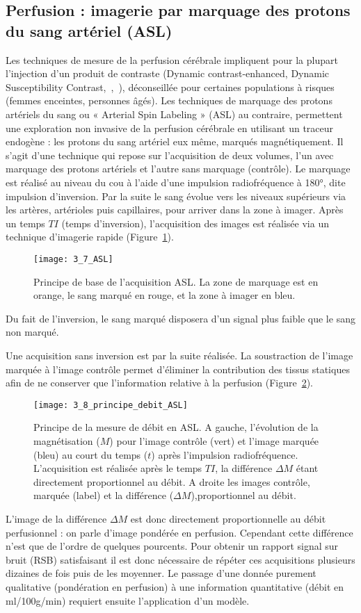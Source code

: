 \subsection{Perfusion : imagerie par marquage des protons du sang artériel (ASL)}
Les techniques de mesure de la perfusion cérébrale impliquent pour la plupart l’injection d’un
produit de contraste (Dynamic contrast-enhanced, Dynamic Susceptibility Contrast,~\cite{Calamante2010},~\cite{OConnor2011}),
déconseillée pour certaines populations à risques (femmes enceintes, personnes âgés). Les techniques
de marquage des protons artériels du sang ou « Arterial Spin Labeling » (ASL) au contraire, permettent
une exploration non invasive de la perfusion cérébrale en utilisant un traceur endogène : les protons
du sang artériel eux même, marqués magnétiquement. Il s’agit d’une technique qui repose sur
l’acquisition de deux volumes, l’un avec marquage des protons artériels et l’autre sans marquage
(contrôle). Le marquage est réalisé au niveau du cou à l’aide d’une impulsion radiofréquence à 180°,
dite impulsion d’inversion. Par la suite le sang évolue vers les niveaux supérieurs via les artères,
artérioles puis capillaires, pour arriver dans la zone à imager. Après un temps $TI$ (temps d’inversion),
l’acquisition des images est réalisée via un technique d’imagerie rapide (Figure~\ref{fig:3_7_ASL}). 
\begin{figure}[!t]
\centering
\texttt{[image: 3\_7\_ASL]}
\caption{Principe de base de l'acquisition ASL. La zone de marquage est en orange, le sang marqué en rouge, et la zone à
imager en bleu.}
\label{fig:3_7_ASL}	
\end{figure}
Du fait de
l’inversion, le sang marqué disposera d’un signal plus faible que le sang non marqué.

Une acquisition sans inversion est par la suite réalisée. La soustraction de l’image marquée à
l’image contrôle permet d’éliminer la contribution des tissus statiques afin de ne conserver que
l’information relative à la perfusion (Figure~\ref{fig:3_8_principe_debit_ASL}).
\begin{figure}[!t]
\centering
\texttt{[image: 3\_8\_principe\_debit\_ASL]}
\caption{Principe de la mesure de débit en ASL. A gauche, l’évolution de la magnétisation ($M$) pour l’image contrôle (vert) et
l’image marquée (bleu) au court du temps ($t$) après l’impulsion radiofréquence. L’acquisition est réalisée après le temps $TI$, la
différence $\Delta M$ étant directement proportionnel au débit. A droite les images contrôle, marquée (label) et la différence ($\Delta M$),proportionnel au débit.}
\label{fig:3_8_principe_debit_ASL}	
\end{figure}
L’image de la différence $\Delta M$ est donc directement proportionnelle au débit perfusionnel : on
parle d’image pondérée en perfusion. Cependant cette différence n’est que de l’ordre de quelques
pourcents. Pour obtenir un rapport signal sur bruit (RSB) satisfaisant il est donc nécessaire de répéter
ces acquisitions plusieurs dizaines de fois puis de les moyenner. Le passage d’une donnée purement
qualitative (pondération en perfusion) à une information quantitative (débit en ml/100g/min) requiert
ensuite l’application d’un modèle.

